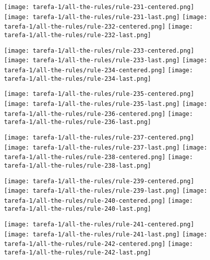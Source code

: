 \begin{figure}[htbp]
  \centering
\texttt{[image: tarefa-1/all-the-rules/rule-231-centered.png]}
\texttt{[image: tarefa-1/all-the-rules/rule-231-last.png]}
\texttt{[image: tarefa-1/all-the-rules/rule-232-centered.png]}
\texttt{[image: tarefa-1/all-the-rules/rule-232-last.png]}
\end{figure}
\begin{figure}[htbp]
  \centering
\texttt{[image: tarefa-1/all-the-rules/rule-233-centered.png]}
\texttt{[image: tarefa-1/all-the-rules/rule-233-last.png]}
\texttt{[image: tarefa-1/all-the-rules/rule-234-centered.png]}
\texttt{[image: tarefa-1/all-the-rules/rule-234-last.png]}
\end{figure}
\begin{figure}[htbp]
  \centering
\texttt{[image: tarefa-1/all-the-rules/rule-235-centered.png]}
\texttt{[image: tarefa-1/all-the-rules/rule-235-last.png]}
\texttt{[image: tarefa-1/all-the-rules/rule-236-centered.png]}
\texttt{[image: tarefa-1/all-the-rules/rule-236-last.png]}
\end{figure}
\begin{figure}[htbp]
  \centering
\texttt{[image: tarefa-1/all-the-rules/rule-237-centered.png]}
\texttt{[image: tarefa-1/all-the-rules/rule-237-last.png]}
\texttt{[image: tarefa-1/all-the-rules/rule-238-centered.png]}
\texttt{[image: tarefa-1/all-the-rules/rule-238-last.png]}
\end{figure}
\begin{figure}[htbp]
  \centering
\texttt{[image: tarefa-1/all-the-rules/rule-239-centered.png]}
\texttt{[image: tarefa-1/all-the-rules/rule-239-last.png]}
\texttt{[image: tarefa-1/all-the-rules/rule-240-centered.png]}
\texttt{[image: tarefa-1/all-the-rules/rule-240-last.png]}
\end{figure}
\begin{figure}[htbp]
  \centering
\texttt{[image: tarefa-1/all-the-rules/rule-241-centered.png]}
\texttt{[image: tarefa-1/all-the-rules/rule-241-last.png]}
\texttt{[image: tarefa-1/all-the-rules/rule-242-centered.png]}
\texttt{[image: tarefa-1/all-the-rules/rule-242-last.png]}
\end{figure}

